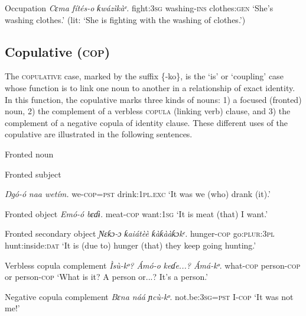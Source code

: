 Occupation
\textit{Cɛma     fítés-}\textit{o}\textit{   ƙwázìkàᵉ.}
fight:\textsc{3sg}   washing-\textsc{ins}   clothes:\textsc{gen}
‘She’s washing clothes.’ (lit: ‘She is fighting with the washing of clothes.’)






\subsection{Copulative (\textsc{cop})}


The \textsc{copulative} case, marked by the suffix \{-ko\}, is the ‘is’ or ‘coupling’ case whose function is to link one noun to another in a relationship of exact identity. In this function, the copulative marks three kinds of nouns: 1) a focused (fronted) noun, 2) the complement of a verbless \textsc{copula} (linking verb) clause, and 3) the complement of a negative copula of identity clause. These different uses of the copulative are illustrated in the following sentences.




Fronted noun




Fronted subject


\textit{Ŋ}\textit{gó-}\textit{ó}\textit{ naa   wetím.}
we-\textsc{cop}=\textsc{pst}   drink:\textsc{1pl.exc}
‘It was we (who) drank (it).’




Fronted object
\textit{Emó-}\textit{ó}\textit{     bɛɗɨ.}
meat-\textsc{cop}   want:\textsc{1sg}
‘It is meat (that) I want.’




Fronted secondary object
\textit{Ɲɛƙɔ{}-}\textit{ɔ}\textit{     ƙaiátèè   ƙàƙààƙɔkᵋ.}
hunger-\textsc{cop}   go:\textsc{plur:3pl}   hunt:inside:\textsc{dat}
‘It is (due to) hunger (that) they keep going hunting.’





Verbless copula complement
\textit{Ìsù-}\textit{kᵒ}\textit{?   Ámó-}\textit{o}\textit{   keɗe...?   Ámá-}\textit{kᵒ}.
what-\textsc{cop}   person-\textsc{cop}   or     person-\textsc{cop}
‘What is it? A person or...? It’s a person.’




Negative copula complement
\textit{Bɛna náá     ɲcù-}\textit{kᵒ}.
not.be:\textsc{3sg}=\textsc{pst}   I-\textsc{cop}
‘It was not me!’






